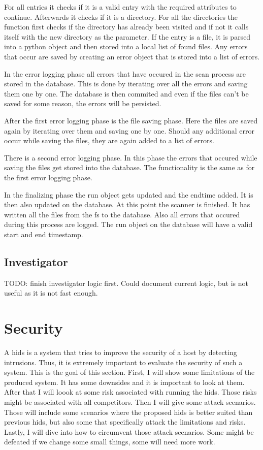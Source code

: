 \documentclass[
	a4paper,					%
	10pt,							%
	twoside,					%
	openright,				%
	notitlepage,			%
	parskip=half,			%
]{scrreprt}					%
\begin{document}
For all entries it checks if it is a valid entry with the required attributes to continue. Afterwards it checks if it is a directory. For all the directories the function first checks if the directory has already been visited and if not it calls itself with the new directory as the parameter. If the entry is a file, it is parsed into a python object and then stored into a local list of found files. Any errors that occur are saved by creating an error object that is stored into a list of errors.

In the error logging phase all errors that have occured in the scan process are stored in the database. This is done by iterating over all the errors and saving them one by one. The database is then commited and even if the files can't be saved for some reason, the errors will be persisted.

After the first error logging phase is the file saving phase. Here the files are saved again by iterating over them and saving one by one. Should any additional error occur while saving the files, they are again added to a list of errors. 

There is a second error logging phase. In this phase the errors that occured while saving the files get stored into the database. The functionality is the same as for the first error logging phase.

In the finalizing phase the run object gets updated and the endtime added. It is then also updated on the database. At this point the scanner is finished. It has written all the files from the \gls{fs} to the database. Also all errors that occured during this process are logged. The run object on the database will have a valid start and end timestamp. 


\subsection{Investigator}
\label{sec:Investigator}

TODO: finish investigator logic first. Could document current logic, but is not useful as it is not fast enough. 

\section{Security}
\label{sec:Security}

A \gls{hids} is a system that tries to improve the security of a host by detecting intrusions. Thus, it is extremely important to evaluate the security of such a system. This is the goal of this section. First, I will show some limitations of the produced system. It has some downsides and it is important to look at them. After that I will loook at some risk associated with running the \gls{hids}. Those risks might be associated with all competitors. Then I will give some attack scenarios. Those will include some scenarios where the proposed \gls{hids} is better suited than previous \gls{hids}, but also some that specifically attack the limitations and risks. Lastly, I will dive into how to circumvent those attack scenarios. Some might be defeated if we change some small things, some will need more work.
\end{document}

